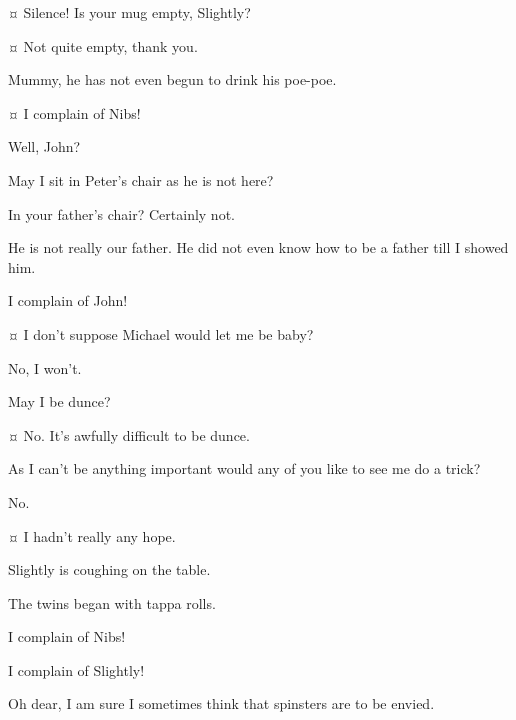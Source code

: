 \begin{drama}

\wendyspeaks {}¤
Silence!
Is your mug empty, Slightly?

\slightlyspeaks {}¤
Not quite empty, thank you.

\nibsspeaks
Mummy, he has not even begun to drink his poe-poe.

\slightlyspeaks {}¤
I complain of Nibs!


\wendyspeaks
Well, John?

\johnspeaks
May I sit in Peter's chair as he is not here?

\wendyspeaks
In your father's chair?
Certainly not.

\johnspeaks
He is not really our father.
He did not even know how to be a father till I showed him.


\secondtwinspeaks
I complain of John!


\tootlesspeaks {}¤
I don't suppose Michael would let me be baby?

\michaelspeaks
No, I won't.

\tootlesspeaks
May I be dunce?

\firsttwinspeaks {}¤
No.
It's awfully difficult to be dunce.

\tootlesspeaks
As I can't be anything important would any of you like to see me do a trick?

No.

\tootlesspeaks {}¤
I hadn't really any hope.


\nibsspeaks
Slightly is coughing on the table.

\curlyspeaks
The twins began with tappa rolls.

\slightlyspeaks
I complain of Nibs!

\nibsspeaks
I complain of Slightly!

\wendyspeaks
Oh dear, I am sure I sometimes think that spinsters are to be envied.


\end{drama}
